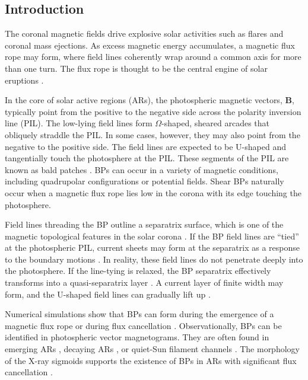 \documentclass[times,twocolumn]{aastex631}
\begin{document}
\begin{CJK*}{UTF8}{gbsn}
\section{Introduction}
\label{sec:intro}

The coronal magnetic fields drive explosive solar activities such as flares and coronal mass ejections. As excess magnetic energy accumulates, a magnetic flux rope may form, where field lines coherently wrap around a common axis for more than one turn. The flux rope is thought to be the central engine of solar eruptions \citep{forbes2000}.

In the core of solar active regions (ARs), the photospheric magnetic vectors, $\bm{B}$, typically point from the positive to the negative side across the polarity inversion line (PIL). The low-lying field lines form $\Omega$-shaped, sheared arcades that obliquely straddle the PIL. In some cases, however, they may also point from the negative to the positive side. The field lines are expected to be U-shaped and tangentially touch the photosphere at the PIL. These segments of the PIL are known as bald patches \citep[BPs;][]{titov1993}. BPs can occur in a variety of magnetic conditions, including quadrupolar configurations or potential fields. Shear BPs naturally occur when a magnetic flux rope lies low in the corona with its edge touching the photosphere.

Field lines threading the BP outline a separatrix surface, which is one of the magnetic topological features in the solar corona \citep{bungey1996}. If the BP field lines are ``tied'' at the photospheric PIL, current sheets may form at the separatrix as a response to the boundary motions \citep{low1988,billinghurst1993}. In reality, these field lines do not penetrate deeply into the photosphere. If the line-tying is relaxed, the BP separatrix effectively transforms into a quasi-separatrix layer \citep{demoulin1996}. A current layer of finite width may form, and the U-shaped field lines can gradually lift up \citep{karpen1990,karpen1991}.

Numerical simulations show that BPs can form during the emergence of a magnetic flux rope \citep{fan2004,archontis2009tri} or during flux cancellation \citep{vanballegooijen1989,aulanier2010}. Observationally, BPs can be identified in photospheric vector magnetograms. They are often found in emerging ARs \citep{okamoto2008,lites2010,kuckein2012}, decaying ARs \citep{yardley2016}, or quiet-Sun filament channels \citep{lopezariste2006}. The morphology of the X-ray sigmoids supports the existence of BPs in ARs with significant flux cancellation \citep{green2007,mckenzie2008}.


\end{CJK*}
\end{document}
